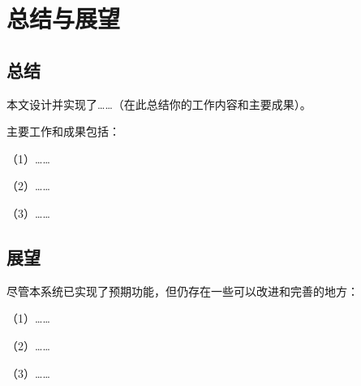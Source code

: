 \chapter{总结与展望}

\section{总结}

本文设计并实现了……（在此总结你的工作内容和主要成果）。

主要工作和成果包括：

（1）……

（2）……

（3）……

\section{展望}

尽管本系统已实现了预期功能，但仍存在一些可以改进和完善的地方：

（1）……

（2）……

（3）……
